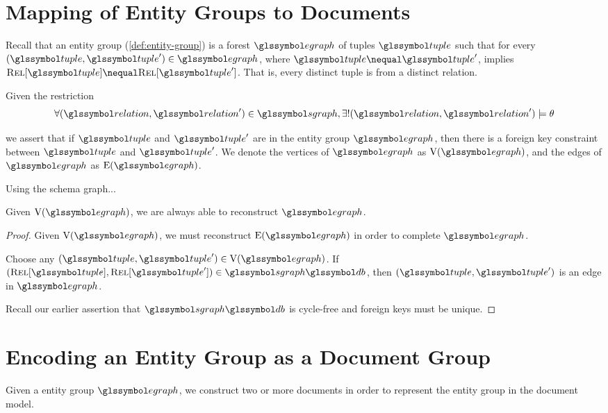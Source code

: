 	
	\section{Mapping of Entity Groups to Documents}
	\label{sec:mapping-entity-groups-to-documents}
		Recall that an entity group (\vref{def:entity-group}) is a forest \(\egraph\) of tuples \(\tuple\) such that for every \((\tuple, \tuple') \in \egraph\), where \(\tuple \nequal \tuple'\), implies \(\relations{\tuple} \nequal \relations{\tuple'}\).  That is, every distinct tuple is from a distinct relation.
		
		Given the restriction
		\[
			\forall (\relation, \relation') \in \sgraph, \exists! (\relation, \relation') \models \theta
		\]
		
		we assert that if \(\tuple\) and \(\tuple'\) are in the entity group \(\egraph\), then there is a foreign key constraint between \(\tuple\) and \(\tuple'\).  We denote the vertices of \(\egraph\) as \(\text{V}(\egraph)\), and the edges of \(\egraph\) as \(\text{E}(\egraph)\).
		
		\begin{ex}
			Using the schema graph...
		\end{ex}
		
		\begin{claim}
		\label{clm:lossless}
			Given \(\text{V}(\egraph)\), we are always able to reconstruct \(\egraph\).
		\end{claim}
		
		\begin{proof}
			Given \(\text{V}(\egraph)\), we must reconstruct \(\text{E}(\egraph)\) in order to complete \(\egraph\).
			
			Choose any \((\tuple, \tuple') \in \text{V}(\egraph)\).	If \((\relations{\tuple}, \relations{\tuple'}) \in \sgraph{\db}\), then \((\tuple, \tuple')\) is an edge in \(\egraph\).
			
			Recall our earlier assertion that \(\sgraph{\db}\) is cycle-free and foreign keys must be unique.
		\end{proof}
		
		
	\section{Encoding an Entity Group as a Document Group}
	\label{sec:encoding-entity-group-as-document-group}
		Given a entity group \(\egraph\), we construct two or more documents in order to represent the entity group in the document model.
		
